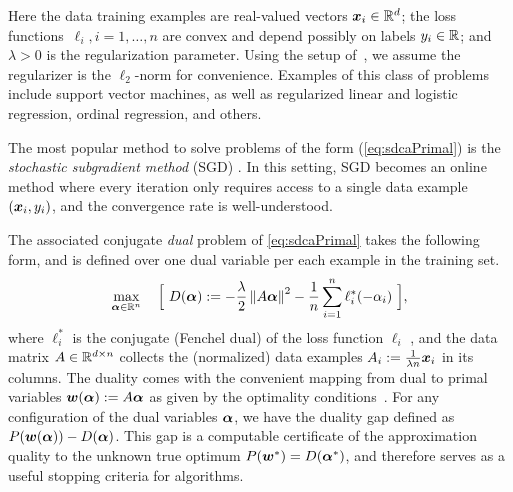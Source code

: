 \documentclass{article} %
\begin{document}
Here the data training examples are real-valued vectors $\bm{x}_i \in \mathbb{R}^d$;
the loss functions~$\ell_i, i=1,\dots,n$ are convex and depend possibly on
labels $y_i \in \mathbb{R}$; and $\lambda>0$ is the
regularization parameter. 
Using the setup of~\cite{ShalevShwartz:2013wl}, we assume
the regularizer is the $\ell_2$-norm for convenience.
Examples of this class of problems include support vector machines, as well
as regularized %
linear and logistic regression, %
ordinal regression, and others.

The most popular method to solve problems of the form (\ref{eq:sdcaPrimal})
is the \emph{stochastic subgradient method} (SGD)
\cite{Robbins:1951ko,Bottou:2010uz,ShalevShwartz:2010cg}. In this setting, SGD becomes an online method where every iteration only requires access
to a single data example $(\bm{x}_i,y_i )$, and the convergence rate is
well-understood.

%
The associated conjugate \emph{dual} problem of \eqref{eq:sdcaPrimal} takes
the following form, and is defined over one dual variable per each example in
the training set.
\begin{equation}
    \label{eq:sdcaDual}
    \max_{\av \in \R^n} \quad \Big[ \ 
    D(\av) := - \frac{\lambda}{2} \norm{ A\av }^2
    - \frac1n \sum_{i=1}^n \ell_i^*(-\alpha_i) \ \Big],
\end{equation}
where $\ell_i^*$ is the conjugate (Fenchel dual) of the loss function
$\ell_i$%
, and the data matrix $A\in\mathbb{R}^{d\times n}$ collects the (normalized) data
examples $A_i := \frac{1}{\lambda n} \bm{x}_i$ in its columns. The duality comes with the convenient mapping from dual to primal variables
${\bm{w}}(\bm{\alpha}) := A\bm{\alpha}$ as given by the optimality
conditions~\cite{ShalevShwartz:2013wl}.
For any configuration of the dual variables $\bm{\alpha}$, we have the duality gap
defined as $P({\bm{w}}(\bm{\alpha})) - D(\bm{\alpha})$. This gap is a computable certificate of
the approximation quality to the unknown true optimum $P({\bm{w}}^*) = D(\bm{\alpha}^*)$,
and therefore serves as a useful stopping criteria for algorithms.
\end{document}
